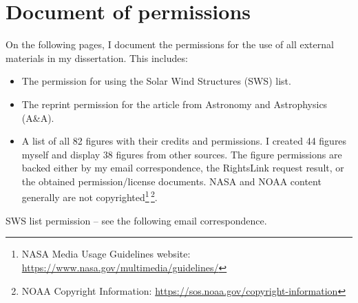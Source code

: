 
\chapter*{Document of permissions}

On the following pages, I document the permissions for the use of all external materials in my dissertation. This includes:
\begin{itemize}
	\item The permission for using the Solar Wind Structures (SWS) list.
	\item The reprint permission for the article from Astronomy and Astrophysics (A\&A).
	\item A list of all 82 figures with their credits and permissions. I created 44 figures myself and display 38 figures from other sources. The figure permissions are backed either by my email correspondence, the RightsLink request result, or the obtained permission/license documents. NASA and NOAA content generally are not copyrighted\footnote{NASA Media Usage Guidelines website: \url{https://www.nasa.gov/multimedia/guidelines/}}\,\footnote{NOAA Copyright Information: \url{https://sos.noaa.gov/copyright-information}}.
	\end{itemize}

\vspace{2cm}

\noindent SWS list permission -- see the following email correspondence.







\renewcommand\listfigurename{List of figures and their permissions}
\lofimagetrue
\listoffigures



